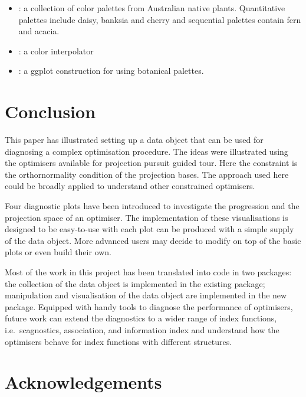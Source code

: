 \begin{itemize}
  \begin{itemize}
  \tightlist
  \item
    : a collection of color palettes from
    Australian native plants. Quantitative palettes include daisy,
    banksia and cherry and sequential palettes contain fern and acacia.
  \item
    : a color interpolator
  \item
    : a ggplot construction for using
    botanical palettes.
  \end{itemize}
\end{itemize}

\hypertarget{conclusion}{%
\section{Conclusion}\label{conclusion}}

This paper has illustrated setting up a data object that can be used for
diagnosing a complex optimisation procedure. The ideas were illustrated
using the optimisers available for projection pursuit guided tour. Here
the constraint is the orthornormality condition of the projection bases.
The approach used here could be broadly applied to understand other
constrained optimisers.

Four diagnostic plots have been introduced to investigate the
progression and the projection space of an optimiser. The implementation
of these visualisations is designed to be easy-to-use with each plot can
be produced with a simple supply of the data object. More advanced users
may decide to modify on top of the basic plots or even build their own.

Most of the work in this project has been translated into code in two
packages: the collection of the data object is implemented in the
existing \citep{tourr} package; manipulation and
visualisation of the data object are implemented in the new 
package. Equipped with handy tools to diagnose the performance of
optimisers, future work can extend the diagnostics to a wider range of
index functions, i.e.~scagnostics, association, and information index
\citep{laa2020using} and understand how the optimisers behave for index
functions with different structures.

\hypertarget{acknowledgements}{%
\section{Acknowledgements}\label{acknowledgements}}

